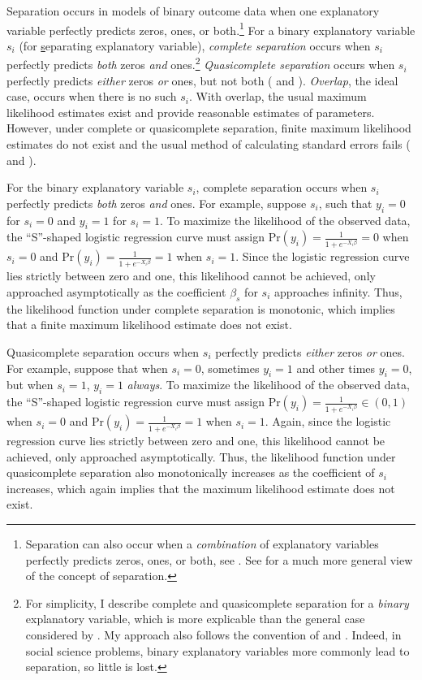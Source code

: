 \documentclass[12pt]{article}
\begin{document}
Separation occurs in models of binary outcome data when one explanatory variable perfectly predicts zeros, ones, or both.\footnote{
Separation can also occur when a \emph{combination} of explanatory variables perfectly predicts zeros, ones, or both, see \cite{LesaffreAlbert1989}. 
See \cite{Geyer2009} for a much more general view of the concept of separation.} 
For a binary explanatory variable $s_i$ (for \underline{s}eparating explanatory variable), \textit{complete separation} occurs when $s_i$ perfectly predicts \emph{both} zeros \emph{and} ones.\footnote{
For simplicity, I describe complete and quasicomplete separation for a \textit{binary} explanatory variable, which is more explicable than the general case considered by \cite{AlbertAnderson1984}. 
My approach also follows the convention of \cite{HeinzeSchemper2002} and \cite{Zorn2005}. 
Indeed, in social science problems, binary explanatory variables more commonly lead to separation, so little is lost.} 
\textit{Quasicomplete separation} occurs when $s_i$ perfectly predicts \emph{either} zeros \emph{or} ones, but not both (\citealt{AlbertAnderson1984} and \citealt{Zorn2005}). 
\textit{Overlap}, the ideal case, occurs when there is no such $s_i$. 
With overlap, the usual maximum likelihood estimates exist and provide reasonable estimates of parameters. 
However, under complete or quasicomplete separation, finite maximum likelihood estimates do not exist and the usual method of calculating standard errors fails (\citealt{AlbertAnderson1984} and \citealt{Zorn2005}).

For the binary explanatory variable $s_i$, complete separation occurs when $s_i$ perfectly predicts \emph{both} zeros \emph{and} ones. 
For example, suppose $s_i$, such that $y_i = 0$ for $s_i = 0$ and $y_i = 1$ for $s_i = 1$. 
To maximize the likelihood of the observed data, the ``S''-shaped logistic regression curve must assign $\text{Pr}(y_i) = \frac{1}{1 + e^{-X_i\beta}} = 0$ when $s_i  = 0$ and $\text{Pr}(y_i) = \frac{1}{1 + e^{-X_i\beta}} = 1$ when $s_i = 1$. 
Since the logistic regression curve lies strictly between zero and one, this likelihood cannot be achieved, only approached asymptotically as the coefficient $\beta_s$ for $s_i$ approaches infinity. 
Thus, the likelihood function under complete separation is monotonic, which implies that a finite maximum likelihood estimate does not exist.

Quasicomplete separation occurs when $s_i$ perfectly predicts \emph{either} zeros \emph{or} ones.
For example, suppose that when $s_i = 0$, sometimes $y_i = 1$ and other times $y_i = 0$, but when $s_i = 1$, $y_i = 1$ \emph{always}. 
To maximize the likelihood of the observed data, the ``S''-shaped logistic regression curve must assign $\text{Pr}(y_i) = \frac{1}{1 + e^{-X_i\beta}} \in (0, 1)$ when $s_i  = 0$ and $\text{Pr}(y_i) = \frac{1}{1 + e^{-X_i\beta}} = 1$ when $s_i = 1$. 
Again, since the logistic regression curve lies strictly between zero and one, this likelihood cannot be achieved, only approached asymptotically. 
Thus, the likelihood function under quasicomplete separation also monotonically increases as the coefficient of $s_i$ increases, which again implies that the maximum likelihood estimate does not exist.
\end{document}
